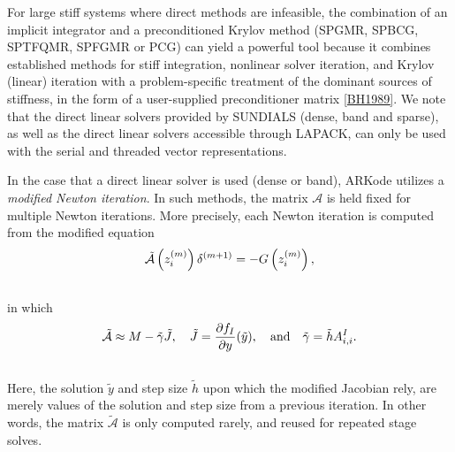 \documentclass[letterpaper,10pt,english]{sphinxmanual}
\begin{document}
For large stiff systems where direct methods are infeasible, the
combination of an implicit integrator and a preconditioned
Krylov method (SPGMR, SPBCG, SPTFQMR, SPFGMR or PCG) can yield a
powerful tool because it combines established methods for stiff
integration, nonlinear solver iteration, and Krylov (linear) iteration
with a problem-specific treatment of the dominant sources of
stiffness, in the form of a user-supplied preconditioner matrix
{\hyperref[References:bh1989]{{[}BH1989{]}}}.  We note that the direct linear solvers
provided by SUNDIALS (dense, band and sparse), as well as the direct
linear solvers accessible through LAPACK, can only be used with the
serial and threaded vector representations.

In the case that a direct linear solver is used (dense or band),
ARKode utilizes a \emph{modified Newton iteration}. In such methods, the
matrix ${\mathcal A}$ is held fixed for multiple Newton
iterations.  More precisely, each Newton iteration is computed from
the modified equation
\label{Mathematics:equation-modified_Newton_system}\begin{gather}
\begin{split}\tilde{\mathcal A}\left(z_i^{(m)}\right) \delta^{(m+1)} = -G\left(z_i^{(m)}\right),\end{split}\label{Mathematics-modified_Newton_system}\\\begin{split}\end{split}\notag
\end{gather}
in which
\label{Mathematics:equation-modified_NewtonMatrix}\begin{gather}
\begin{split}\tilde{\mathcal A} \approx M - \tilde{\gamma} \tilde{J}, \quad \tilde{J} =
\frac{\partial f_I}{\partial y}(\tilde y), \quad\text{and}\quad
\tilde{\gamma} = \tilde{h} A^I_{i,i}.\end{split}\label{Mathematics-modified_NewtonMatrix}\\\begin{split}\end{split}\notag
\end{gather}
Here, the solution $\tilde{y}$ and step size $\tilde{h}$
upon which the modified Jacobian rely, are merely values of the
solution and step size from a previous iteration.  In other words, the
matrix $\tilde{\mathcal A}$ is only computed rarely, and reused for
repeated stage solves.
\end{document}
